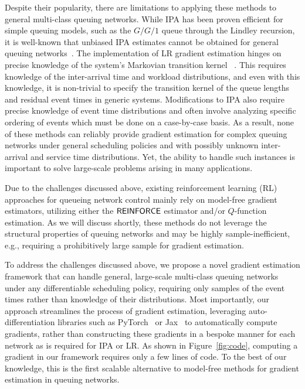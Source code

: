 Despite their popularity, there are limitations to applying these methods to general multi-class queuing networks. While IPA has been proven efficient for simple queuing models, such as the $G/G/1$ queue through the Lindley recursion, it is well-known that unbiased IPA estimates cannot be obtained for general queuing networks~\cite{cao1987first,fu1994smoothed,fu2012conditional}. The implementation of LR gradient estimation hinges on precise knowledge of the system's Markovian transition kernel ~\cite{glynn1987likelilood}. This requires knowledge of the inter-arrival time and workload distributions, and even with this knowledge, it is non-trivial to specify the transition kernel of the queue lengths and residual event times in generic systems. Modifications to IPA \cite{fu1994smoothed, fu2012conditional} also require precise knowledge of event time distributions and often involve analyzing specific ordering of events which must be done on a case-by-case basis. As a result, none of these methods can reliably provide gradient estimation for complex queuing networks under general scheduling policies and with possibly unknown inter-arrival and service time distributions. Yet, the ability to handle such instances is important to solve large-scale problems arising in many applications.

Due to the challenges discussed above, existing reinforcement learning (RL) approaches for queueing network control mainly rely on model-free gradient estimators, utilizing either the $\mathsf{REINFORCE}$ estimator and/or $Q$-function estimation. As we will discuss shortly, these methods do not leverage the structural properties of queuing networks and may be highly sample-inefficient, e.g., requiring a prohibitively large sample for gradient estimation.

To address the challenges discussed above, we propose a novel gradient estimation framework that can handle general, large-scale multi-class queuing networks under any differentiable scheduling policy, requiring only samples of the event times rather than knowledge of their distributions. Most importantly, our approach streamlines the process of gradient estimation, leveraging auto-differentiation libraries such as PyTorch~\citep{PaszkeGrChChYaDeLiDeAnLe17} or Jax~\citep{jax2018github} to automatically compute gradients, rather than constructing these gradients in a bespoke manner for each network as is required for IPA or LR. As shown in Figure~\ref{fig:code}, computing a gradient in our framework requires only a few lines of code. To the best of our knowledge, this is the first scalable alternative to model-free methods for gradient estimation in queuing networks.

